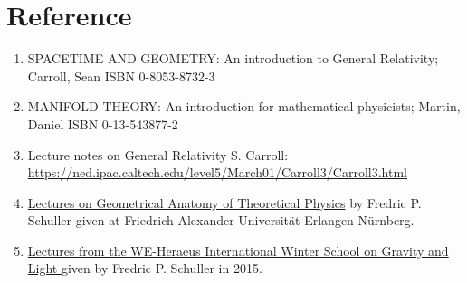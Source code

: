 \documentclass[a4paper]{report}
\theoremstyle{definition}
\theoremstyle{remark}
\begin{document}
	\section*{Reference}
		\begin{enumerate}
			\item SPACETIME AND GEOMETRY: An introduction to General Relativity; Carroll, Sean ISBN 0-8053-8732-3
			\item MANIFOLD THEORY: An introduction for mathematical physicists; Martin, Daniel ISBN 0-13-543877-2
			\item  Lecture notes on General Relativity S. Carroll: \href{https://ned.ipac.caltech.edu/level5/March01/Carroll3/Carroll3.html}{https://ned.ipac.caltech.edu/level5/March01/Carroll3/Carroll3.html}
			\item \href{https://www.youtube.com/playlist?list=PLPH7f_7ZlzxTi6kS4vCmv4ZKm9u8g5yic}{Lectures on Geometrical Anatomy of Theoretical Physics} by Fredric P. Schuller given at Friedrich-Alexander-Universität Erlangen-Nürnberg.
			\item \href{https://www.youtube.com/watch?v=7G4SqIboeig&list=PLMsYJgjgZE8hh6d6ia2dP1NI0BKNRXbiw}{Lectures from the WE-Heraeus International Winter School on Gravity and Light
			} given by Fredric P. Schuller in 2015.
		\end{enumerate}
\end{document}
